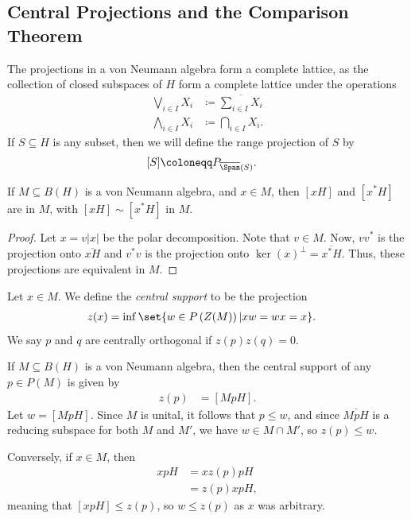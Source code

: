 \documentclass[10pt]{mypackage}
\renewcommand{\coloneq}{\coloneqq}
\begin{document}
\subsection{Central Projections and the Comparison Theorem}%
The projections in a von Neumann algebra form a complete lattice, as the collection of closed subspaces of $H$ form a complete lattice under the operations
\begin{align*}
  \bigvee_{i\in I}X_i &\coloneq \overline{\sum_{i\in I}X_i}\\
  \bigwedge_{i\in I}X_i &\coloneq \bigcap_{i\in I} X_i.
\end{align*}
If $S\subseteq H$ is any subset, then we will define the range projection of $S$ by
\begin{align*}
  \left[ S \right] &\coloneq P_{ \overline{\Span}(S) }.
\end{align*}
\begin{proposition}
  If $M\subseteq B(H)$ is a von Neumann algebra, and $x\in M$, then $\left[ xH \right]$ and $\left[ x^{\ast}H \right]$ are in $M$, with $\left[ xH \right] \sim \left[ x^{\ast}H \right]$ in $M$.
\end{proposition}
\begin{proof}
  Let $x = v\left\vert x \right\vert$ be the polar decomposition. Note that $v\in M$. Now, $vv^{\ast}$ is the projection onto $ \overline{xH} $ and $ v^{\ast}v  $ is the projection onto $\ker\left( x \right)^{\perp} = \overline{x^{\ast}H}$. Thus, these projections are equivalent in $M$.
\end{proof}
\begin{definition}
  Let $x\in M$. We define the \textit{central support} to be the projection
  \begin{align*}
    z(x) &= \inf\set{w\in P\left(Z(M)\right) | xw = wx = x}.
  \end{align*}
  We say $p$ and $q$ are centrally orthogonal if $z(p)z(q) = 0$.
\end{definition}
\begin{lemma}
  If $M\subseteq B(H)$ is a von Neumann algebra, then the central support of any $p\in P(M)$ is given by
  \begin{align*}
    z(p) &= \left[ MpH \right].
  \end{align*}
  Let $w = \left[ MpH \right]$. Since $M$ is unital, it follows that $p\leq w$, and since $ \overline{MpH} $ is a reducing subspace for both $M$ and $M'$, we have $w\in M\cap M'$, so $z(p)\leq w$.

  Conversely, if $x\in M$, then
  \begin{align*}
    xpH &= x z(p) p H\\
        &= z(p) xpH,
  \end{align*}
  meaning that $\left[ xpH \right]\leq z(p)$, so $w\leq z(p)$ as $x$ was arbitrary.
\end{lemma}
\end{document}
